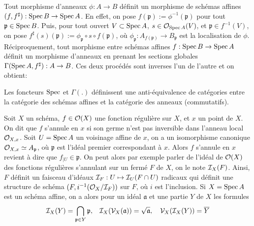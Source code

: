 Tout morphisme d'anneaux $\phi:A\rightarrow B$ définit un morphisme de schémas affines $(f,f^\sharp):\operatorname{Spec} B\rightarrow\operatorname{Spec} A$. En effet, on pose $f(\mathfrak{p}):=\phi^{-1}(\mathfrak{p})$ pour tout $\mathfrak{p}\in \operatorname{Spec} B$. Puis, pour tout ouvert $V\subset \operatorname{Spec} A$, $s\in\mathcal{O}_{\operatorname{Spec} A}(V)$, et $\mathfrak{p}\in f^{-1}(V)$, on pose $f^\sharp(s)(\mathfrak{p}):=\phi_{\mathfrak{p}}\circ s \circ f(\mathfrak{p})$, où $\phi_{\mathfrak{p}}:A_{f(\mathfrak{p})}\rightarrow B_{\mathfrak{p}}$ est la localisation de $\phi$.
Réciproquement, tout morphisme entre schémas affines $f:\operatorname{Spec} B\rightarrow \operatorname{Spec} A$ définit un morphisme d'anneaux en prenant les sections globales $\Gamma(\operatorname{Spec} A, f^\sharp):A\rightarrow B$. Ces deux procédés sont inverses l'un de l'autre et on obtient:


\begin{prop}\label{EqCat}
Les foncteurs $\operatorname{Spec}$ et $\Gamma(.)$ définissent une anti-équivalence de catégories entre la catégorie des schémas affines et la catégorie des anneaux (commutatifs).
\end{prop}

Soit $X$ un schéma, $f\in \mathcal{O}(X)$ une fonction régulière sur $X$, et $x$ un point de $X$. On dit que $f$ s'annule en $x$ si son germe n'est pas inversible dans l'anneau local $\mathcal{O}_{X,x}$. Soit $U=\operatorname{Spec} A$ un voisinage affine de $x$, on a un isomorphisme canonique $\mathcal{O}_{X,x}\simeq A_\mathfrak{p}$, où $\mathfrak{p}$ est l'idéal premier correspondant à $x$. Alors $f$ s'annule en $x$ revient à dire que $f_{|U}\in \mathfrak{p}$. On peut alors par exemple parler de l'idéal de $\mathcal{O}(X)$ des fonctions régulières s'annulant sur un fermé $F$ de $X$, on le note $\mathcal{I}_X(F)$. Ainsi, $F$ définit un faisceau d'idéaux $\mathcal{I}_F:U\mapsto \mathcal{I}_U(F\cap U)$ radicaux qui définit une structure de schéma $(F, i^{-1}(\mathcal{O}_X/\mathcal{I}_F))$ sur $F$, où $i$ est l'inclusion. Si $X=\operatorname{Spec} A$ est un schéma affine, on a alors pour un idéal $\mathfrak{a}$ et une partie $Y$ de $X$ les formules
$$\mathcal{I}_X(Y)=\bigcap_{\mathfrak{p}\in Y}\mathfrak{p},\,\,\,\,\, \mathcal{I}_X(\mathcal{V}_X(\mathfrak{a}))=\sqrt{\mathfrak{a}},\,\,\,\,\,\,\mathcal{V}_X(\mathcal{I}_X(Y))=\overline{Y}$$

